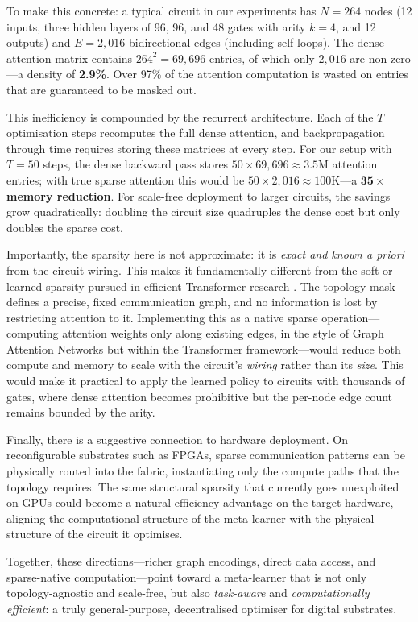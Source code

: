 To make this concrete: a typical circuit in our experiments has $N=264$ nodes (12 inputs, three hidden layers of 96, 96, and 48 gates with arity $k=4$, and 12 outputs) and $E=2{,}016$ bidirectional edges (including self-loops). The dense attention matrix contains $264^2 = 69{,}696$ entries, of which only $2{,}016$ are non-zero---a density of \textbf{2.9\%}. Over 97\% of the attention computation is wasted on entries that are guaranteed to be masked out.

This inefficiency is compounded by the recurrent architecture. Each of the $T$ optimisation steps recomputes the full dense attention, and backpropagation through time requires storing these matrices at every step. For our setup with $T=50$ steps, the dense backward pass stores $50 \times 69{,}696 \approx 3.5$M attention entries; with true sparse attention this would be $50 \times 2{,}016 \approx 100$K---a \textbf{$\mathbf{35\times}$ memory reduction}. For scale-free deployment to larger circuits, the savings grow quadratically: doubling the circuit size quadruples the dense cost but only doubles the sparse cost.

Importantly, the sparsity here is not approximate: it is \textit{exact and known a priori} from the circuit wiring. This makes it fundamentally different from the soft or learned sparsity pursued in efficient Transformer research \citep{tay2022efficienttransformerssurvey}. The topology mask defines a precise, fixed communication graph, and no information is lost by restricting attention to it. Implementing this as a native sparse operation---computing attention weights only along existing edges, in the style of Graph Attention Networks \citep{velickovic_graph_2018} but within the Transformer framework---would reduce both compute and memory to scale with the circuit's \textit{wiring} rather than its \textit{size}. This would make it practical to apply the learned policy to circuits with thousands of gates, where dense attention becomes prohibitive but the per-node edge count remains bounded by the arity.

Finally, there is a suggestive connection to hardware deployment. On reconfigurable substrates such as FPGAs, sparse communication patterns can be physically routed into the fabric, instantiating only the compute paths that the topology requires. The same structural sparsity that currently goes unexploited on GPUs could become a natural efficiency advantage on the target hardware, aligning the computational structure of the meta-learner with the physical structure of the circuit it optimises.

Together, these directions---richer graph encodings, direct data access, and sparse-native computation---point toward a meta-learner that is not only topology-agnostic and scale-free, but also \textit{task-aware} and \textit{computationally efficient}: a truly general-purpose, decentralised optimiser for digital substrates.